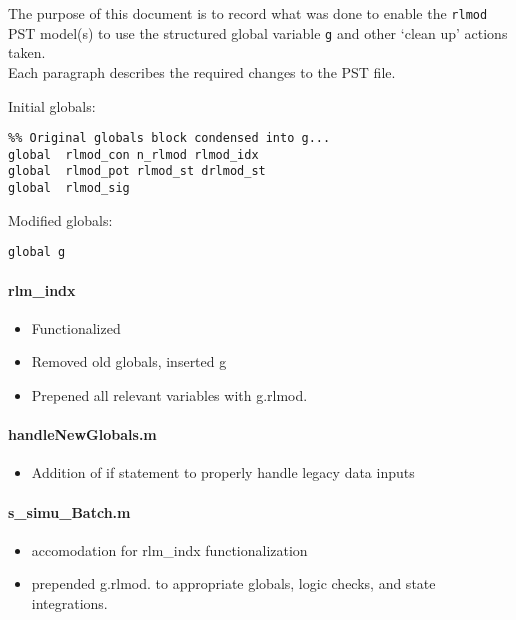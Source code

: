 \documentclass[12pt]{article}
\begin{document}
The purpose of this document is to record what was done to enable the \verb|rlmod| PST model(s) to use the structured global variable \verb|g| and other `clean up' actions taken. \\
Each paragraph describes the required changes to the PST file.

Initial globals:
\begin{verbatim}
%% Original globals block condensed into g...
global  rlmod_con n_rlmod rlmod_idx
global  rlmod_pot rlmod_st drlmod_st
global  rlmod_sig
\end{verbatim}

Modified globals:
\begin{verbatim}
global g
\end{verbatim}

\paragraph{rlm\_indx}
	\begin{itemize}
		\item Functionalized
		\item  Removed old globals, inserted g
		\item Prepened all relevant variables with g.rlmod.
	\end{itemize}

\paragraph{handleNewGlobals.m}
	\begin{itemize}
		\item Addition of if statement to properly handle legacy data inputs
	\end{itemize}

\paragraph{s\_simu\_Batch.m}
	\begin{itemize}
		\item accomodation for rlm\_indx functionalization
		\item prepended g.rlmod. to appropriate globals, logic checks, and state integrations.
	\end{itemize}
\end{document}
